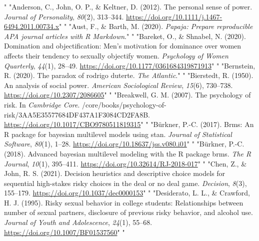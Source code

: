 \documentclass[
"  donotrepeattitle,doc, 12pt, a4paper,floatsintext]{apa7}"
\begin{document}
\hypertarget{refs}{}
\begin{CSLReferences}{1}{0}
"\leavevmode{}%
"Anderson, C., John, O. P., \& Keltner, D. (2012). The personal sense of power. \emph{Journal of Personality}, \emph{80}(2), 313--344. \url{https://doi.org/10.1111/j.1467-6494.2011.00734.x}"
"\leavevmode{}%
"Aust, F., \& Barth, M. (2020). \emph{Papaja: {Prepare} reproducible {APA} journal articles with {R Markdown}}."
"\leavevmode{}%
"Bareket, O., \& Shnabel, N. (2020). Domination and objectification: Men's motivation for dominance over women affects their tendency to sexually objectify women. \emph{Psychology of Women Quarterly}, \emph{44}(1), 28--49. \url{https://doi.org/10.1177/0361684319871913}"
"\leavevmode{}%
"Bernstein, R. (2020). The paradox of rodrigo duterte. \emph{The Atlantic}."
"\leavevmode{}%
"Bierstedt, R. (1950). An analysis of social power. \emph{American Sociological Review}, \emph{15}(6), 730--738. \url{https://doi.org/10.2307/2086605}"
"\leavevmode{}%
"Breakwell, G. M. (2007). The psychology of risk. In \emph{Cambridge Core}. /core/books/psychology-of-risk/3AA5E35577684DF437A1F3084CD2FA8B. \url{https://doi.org/10.1017/CBO9780511819315}"
"\leavevmode{}%
"Bürkner, P.-C. (2017). Brms: An {R} package for bayesian multilevel models using stan. \emph{Journal of Statistical Software}, \emph{80}(1), 1--28. \url{https://doi.org/10.18637/jss.v080.i01}"
"\leavevmode{}%
"Bürkner, P.-C. (2018). Advanced bayesian multilevel modeling with the {R} package brms. \emph{The R Journal}, \emph{10}(1), 395--411. \url{https://doi.org/10.32614/RJ-2018-017}"
"\leavevmode{}%
"Chen, Z., \& John, R. S. (2021). Decision heuristics and descriptive choice models for sequential high-stakes risky choices in the deal or no deal game. \emph{Decision}, \emph{8}(3), 155--179. \url{https://doi.org/10.1037/dec0000153}"
"\leavevmode{}%
"Desiderato, L. L., \& Crawford, H. J. (1995). Risky sexual behavior in college students: Relationships between number of sexual partners, disclosure of previous risky behavior, and alcohol use. \emph{Journal of Youth and Adolescence}, \emph{24}(1), 55--68. \url{https://doi.org/10.1007/BF01537560}"
"\leavevmode{}%

\end{CSLReferences}
\end{document}
